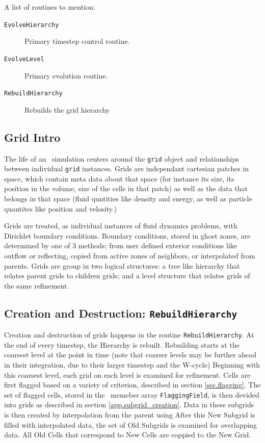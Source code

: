 A list of routines to mention: 
\begin{description}
 \item[\tt{EvolveHierarchy}] Primary timestep control routine. 
 \item[\tt{EvolveLevel}] Primary evolution routine.
 \item[\tt{RebuildHierarchy}] Rebuilds the grid hierarchy
\end{description}

\subsection{Grid Intro}
The life of an \enzo\ simulation centers around the {\tt grid}
object and relationships between individual {\tt grid} instances.  
Grids are independant cartesian patches in space, which contain meta data about
that space (for instance its size, its position in the volume, 
size of the cells in that patch) as well as the data that belongs in
that space (fluid quntities like density and energy, as well as
particle quantites like position and velosity.)

Grids are treated, as individual instances of fluid
dynamics problems, with Dirichlet boundary conditions.  Boundary
conditions, stored in ghost zones, are determined by
one of 3 methods; from user defined exterior conditions like
outflow or reflecting, copied from active zones of 
neighbors, or interpolated from parents.  Grids are group in two
logical structures: a tree like hierarchy that relates parent grids to
children grids; and a level structure that relates grids of the same
refinement.  

\subsection{Creation and Destruction: \tt{RebuildHierarchy}}
Creation and destruction of grids happens in the routine
{\tt RebuildHierarchy}.  
At the end of every timestep, the Hierarchy is rebuilt.
Rebuilding starts at the coarsest level at the point in time (note
that coarser levels may be further ahead in their integration, due to
their larger timestep and the W-cycle)  Beginning with this coarsest level, each
grid on each level is examined for refinement.  Cells are first flagged
based on a variety of criterion, described in section
\ref{sec.flagging}.  The set of flagged cells, stored in the \grid\ memeber
array {\tt FlaggingField}, is then devided into grids as described
in section \ref{app.subgrid_creation}.  Data in these subgrids
is then created by interpolation from the parent using   After this New Subgrid is filled with
interpolated data, the set of Old Subgrids is examined for overlapping
data.  All Old Cells that correspond to New Cells are coppied to the
New Grid.

